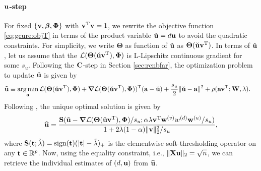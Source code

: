 \documentclass[12pt]{article}
\def\trans{^{\rm T}}
\newcommand{\bbL}{\mathcal{L}}
\DeclareMathOperator*{\argmin}{arg\,min}
\newcommand{\bs}{\boldsymbol}
\begin{document}
\paragraph{${\bf u}$-step}\label{par:u}
For fixed $\{{\bf v}, \mbox{\boldmath $\beta$}, \mbox{\boldmath $\Phi$}\}$ with $\v\trans\v = 1$, we rewrite the objective function \eqref{eq:gcure:objT} in terms of the product variable $\check{{\bf u}} = d{\bf u}$  to avoid the quadratic constraints. For simplicity, we write $\bs\Theta$ as function of $\check{{\bf u}}$ as $\bs\Theta(\check{\u}\v\trans)$.  In terms of $\check{{\bf u}}$, let us assume that the $\bbL(\bs\Theta(\check{\u}\v\trans), \bPhi)$ is  L-Lipschitz continuous gradient for some $s_u$. Following the ${\bf C}$-step in Section \ref{sec:rcnbfar},  the optimization problem to update  $\check{{\bf u}}$ is given by 
\begin{align*}
\what{\u} \equiv \argmin_{\a} \bbL(\bs\Theta(\check{\u}\v\trans), \bPhi)  &+  \bs\nabla \bbL(\bs\Theta(\check{\u}\v\trans), \bPhi))\trans ( \a - \check{\u})  +\frac{s_u}{2} \|\check{\u} - \a\|^2 + \rho(\a\v\trans;\W,\lambda). 
\end{align*}
Following \citet{zou2005}, the unique optimal solution 
is given by
\begin{align}
\what{\u} = \frac{\mathcal{\S}(\check{\u} -  \bs\nabla \bbL(\bs\Theta(\check{\u}\v\trans),\bPhi)/s_u; 
\alpha \lambda\v\trans\w^{(v)} w^{(d)} \w^{(u)}/s_u )}{1+2\lambda(1-\alpha)\|\v\|_2^2/s_u}, \label{eq:ustepupdate}
\end{align}
where  $\mathcal{{\bf S}}({\bf t};\tilde{\lambda}) = \mbox{sign}({\bf t})(|{\bf t}|-\tilde{\lambda})_+$ is the elementwise soft-thresholding operator on any ${\bf t} \in \mathbb{R}^p$. Now, using the equality constraint, i.e., $\|{\bf X}{\bf u}\|_2 = \sqrt{n}$, we can retrieve the individual estimates of $(d,{\bf u})$ from $\widehat{{\bf u}}$.
\end{document}
